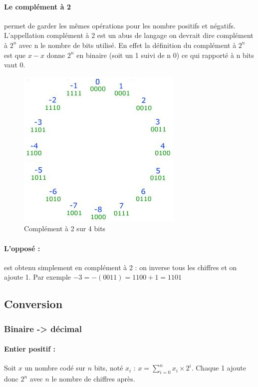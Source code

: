 \documentclass[10pt,a4paper,twoside]{article}
\begin{document}
\paragraph{Le complément à 2} permet de garder les mêmes opérations pour les nombre positifs et négatifs. L'appellation complément à 2 est un abus de langage on devrait dire complément à $2^{n}$ avec n le nombre de bits utilisé. En effet la définition du complément à $2^{n}$ est que $x-x$ donne $2^{n}$ en binaire (soit un 1 suivi de n 0) ce qui rapporté à n bits vaut 0. 

\begin{figure}[hbtp]
\caption{Complément à 2 sur 4 bits}
\centering
\includegraphics[scale=0.5]{cercleBinaire.jpg}
\end{figure}

\paragraph{L'opposé :} est obtenu simplement en complément à 2 : on inverse tous les chiffres et on ajoute 1. Par exemple $-3=-(0011)=1100+1=1101$

\subsection{Conversion}
\subsubsection{Binaire -> décimal}
\paragraph{Entier positif :} Soit $x$ un nombre codé sur $n$ bits, noté $x_{i}$ : $x = \sum_{i=0}^{n}x_{i} \times 2^{i}$. Chaque 1 ajoute donc $2^{n}$ avec $n$ le nombre de chiffres après.
\end{document}
